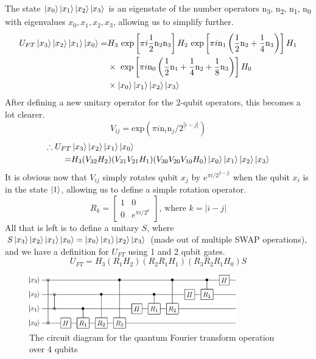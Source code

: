 \documentclass[a4paper,10pt, titlepage, twoside]{article}
\begin{document}
The state $\ket{x_0} \ket{x_1} \ket{x_2} \ket{x_3}$ is an eigenstate of the number operators n\textsubscript{3}, n\textsubscript{2}, n\textsubscript{1}, n\textsubscript{0} with eigenvalues $x_0, x_1, x_2, x_3$, allowing us to simplify further.
\begin{align*}
U_{FT} \ket{x_3} \ket{x_2} \ket{x_1} \ket{x_0} = & H_3 \text{ exp}\left[\pi i \frac{1}{2} \text{n}_2 \text{n}_3 \right]H_2 \text{ exp}\left[\pi i \text{n}_1 \left(\frac{1}{2} \text{n}_2 + \frac{1}{4}\text{n}_3 \right) \right]H_1 \\
& \times \text{ exp}\left[\pi i \text{n}_0 \left(\frac{1}{2} \text{n}_1 + \frac{1}{4} \text{n}_2 + \frac{1}{8} \text{n}_3\right) \right]H_0\\
& \times \ket{x_0} \ket{x_1} \ket{x_2} \ket{x_3}
\end{align*}
After defining a new unitary operator for the 2-qubit operators, this becomes a lot clearer.
$$V_{ij} = \text{exp}(\pi i \text{n}_i \text{n}_j / 2^{|i - j|})$$
\begin{align*}
\therefore U_{FT}& \ket{x_3} \ket{x_2} \ket{x_1} \ket{x_0} \\
= & H_3 (V_{32}H_2)(V_{31}V_{21}H_1)(V_{30}V_{20}V_{10}H_0)\ket{x_0} \ket{x_1} \ket{x_2} \ket{x_3}
\end{align*}
It is obvious now that $V_{ij}$ simply rotates qubit $x_j$ by $e^{\pi i / 2^{|i-j|}}$ when the qubit $x_i$ is in the state $\ket 1$, allowing us to define a simple rotation operator.
$$R_k =
\begin{bmatrix}
    1 & 0\\
    0 & e^{\pi i / 2^k}
\end{bmatrix}
\text{, where } k = |i - j|
$$
All that is left is to define a unitary $S$, where $S\ket{x_3} \ket{x_2} \ket{x_1} \ket{x_0} = \ket{x_0} \ket{x_1} \ket{x_2} \ket{x_3}$ (made out of multiple SWAP operations), and we have a definition for $U_{FT}$ using 1 and 2 qubit gates.
$$U_{FT} = H_3 (R_{1}H_2)(R_{2}R_{1}H_1)(R_{3}R_{2}R_{1}H_0)S$$

\begin{figure}[H]
    \centering
    \includegraphics[width=0.8\textwidth]{qft}
    \caption{The circuit diagram for the quantum Fourier transform operation over 4 qubits}
\end{figure}
\end{document}
